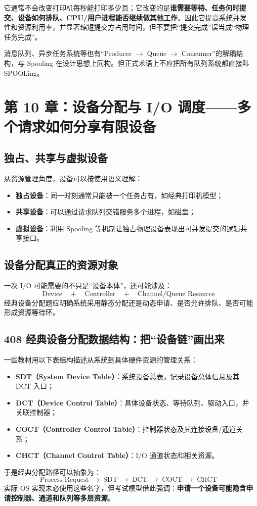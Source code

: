 \documentclass[11pt,a4paper]{ctexart}
\newcommand{\kw}[1]{\textbf{#1}}
\newcommand{\arr}{\;\longrightarrow\;}
\begin{document}
\begin{warn}
它通常不会改变打印机每秒能打印多少页；它改变的是\kw{谁需要等待、任务何时提交、设备如何排队、CPU/用户进程能否继续做其他工作}。因此它提高系统并发性和资源利用率，并显著缩短提交方占用时间，但不要把“提交完成”误当成“物理任务完成”。
\end{warn}

\begin{eng}
消息队列、异步任务系统等也有“Producer $\to$ Queue $\to$ Consumer”的解耦结构，与 Spooling 在设计思想上同构。但正式术语上不应把所有队列系统都直接叫 SPOOLing。
\end{eng}

\section{第 10 章：设备分配与 I/O 调度——多个请求如何分享有限设备}

\subsection{独占、共享与虚拟设备}
从资源管理角度，设备可以按使用语义理解：
\begin{itemize}
  \item \kw{独占设备}：同一时刻通常只能被一个任务占有，如经典打印机模型；
  \item \kw{共享设备}：可以通过请求队列交错服务多个进程，如磁盘；
  \item \kw{虚拟设备}：利用 Spooling 等机制让独占物理设备表现出可并发提交的逻辑共享接口。
\end{itemize}

\subsection{设备分配真正的资源对象}
一次 I/O 可能需要的不只是“设备本体”，还可能涉及：
\[
\text{Device}\quad+\quad\text{Controller}\quad+\quad\text{Channel/Queue Resource}
\]
经典设备分配题应明确系统采用静态分配还是动态申请、是否允许排队、是否可能形成资源等待环。

\subsection{408 经典设备分配数据结构：把“设备链”画出来}
一些教材用以下表结构描述从系统到具体硬件资源的管理关系：
\begin{itemize}
  \item \kw{SDT（System Device Table）}：系统设备总表，记录设备总体信息及其 DCT 入口；
  \item \kw{DCT（Device Control Table）}：具体设备状态、等待队列、驱动入口，并关联控制器；
  \item \kw{COCT（Controller Control Table）}：控制器状态及其连接设备/通道关系；
  \item \kw{CHCT（Channel Control Table）}：I/O 通道状态和相关资源。
\end{itemize}
于是经典分配路径可以抽象为：
\[
\boxed{\text{Process Request}\arr\text{SDT}\arr\text{DCT}\arr\text{COCT}\arr\text{CHCT}}
\]
实际 OS 实现未必使用这些名字，但考试模型借此强调：\kw{申请一个设备可能隐含申请控制器、通道和队列等多层资源}。
\end{document}
